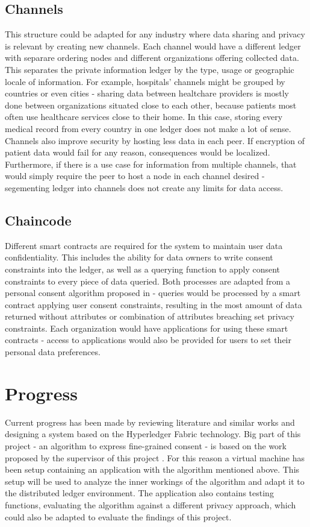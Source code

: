 \documentclass[12pt]{article}
\begin{document}
        \subsection{Channels}
        This structure could be adapted for any industry where data sharing and privacy is relevant by creating new channels. Each channel would have a different ledger with separare ordering nodes and different organizations offering collected data. This separates the private information ledger by the type, usage or geographic locale of information. For example, hospitals' channels might be grouped by countries or even cities - sharing data between healtchare providers is mostly done between organizations situated close to each other, because patients most often use healthcare services close to their home. In this case, storing every medical record from every country in one ledger does not make a lot of sense. Channels also improve security by hosting less data in each peer. If encryption of patient data would fail for any reason, consequences would be localized. Furthermore, if there is a use case for information from multiple channels, that would simply require the peer to host a node in each channel desired - segementing ledger into channels does not create any limits for data access.

        \subsection{Chaincode}
        Different smart contracts are required for the system to maintain user data confidentiality. This includes the ability for data owners to write consent constraints into the ledger, as well as a querying function to apply consent constraints to every piece of data queried. Both processes are adapted from a personal consent algorithm proposed in \cite{konstantinidis} - queries would be processed by a smart contract applying user consent constraints, resulting in the most amount of data returned without attributes or combination of attributes breaching set privacy constraints. Each organization would have applications for using these smart contracts - access to applications would also be provided for users to set their personal data preferences.


    \section{Progress}
    Current progress has been made by reviewing literature and similar works and designing a system based on the Hyperledger Fabric technology. Big part of this project - an algorithm to express fine-grained consent - is based on the work proposed by the supervisor of this project \cite{konstantinidis}. For this reason a virtual machine has been setup containing an application with the algorithm mentioned above. This setup will be used to analyze the inner workings of the algorithm and adapt it to the distributed ledger environment. The application also contains testing functions, evaluating the algorithm against a different privacy approach, which could also be adapted to evaluate the findings of this project.
\end{document}
